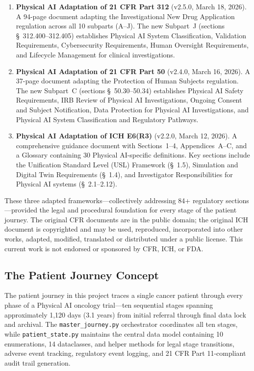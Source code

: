 \documentclass{article}
\begin{document}
\begin{enumerate}[leftmargin=*]
\item \textbf{Physical AI Adaptation of 21 CFR Part 312} (v2.5.0, March 18, 2026). A 94-page document adapting the Investigational New Drug Application regulation across all 10 subparts (A--J). The new Subpart~J (sections \S~312.400--312.405) establishes Physical AI System Classification, Validation Requirements, Cybersecurity Requirements, Human Oversight Requirements, and Lifecycle Management for clinical investigations.

\item \textbf{Physical AI Adaptation of 21 CFR Part 50} (v2.4.0, March 16, 2026). A 37-page document adapting the Protection of Human Subjects regulation. The new Subpart~C (sections \S~50.30--50.34) establishes Physical AI Safety Requirements, IRB Review of Physical AI Investigations, Ongoing Consent and Subject Notification, Data Protection for Physical AI Investigations, and Physical AI System Classification and Regulatory Pathways.

\item \textbf{Physical AI Adaptation of ICH E6(R3)} (v2.2.0, March 12, 2026). A comprehensive guidance document with Sections~1--4, Appendices~A--C, and a Glossary containing 30 Physical AI-specific definitions. Key sections include the Unification Standard Level (USL) Framework (\S~1.5), Simulation and Digital Twin Requirements (\S~1.4), and Investigator Responsibilities for Physical AI systems (\S~2.1--2.12).
\end{enumerate}

These three adapted frameworks---collectively addressing 84+ regulatory sections---provided the legal and procedural foundation for every stage of the patient journey. The original CFR documents are in the public domain; the original ICH document is copyrighted and may be used, reproduced, incorporated into other works, adapted, modified, translated or distributed under a public license. This current work is not endorsed or sponsored by CFR, ICH, or FDA.

\tableofcontents

\vspace{0.05cm}

\subsection{The Patient Journey Concept}

The patient journey in this project traces a single cancer patient through every phase of a Physical AI oncology trial---ten sequential stages spanning approximately 1,120 days (3.1 years) from initial referral through final data lock and archival. The \texttt{master\_journey.py} orchestrator coordinates all ten stages, while \texttt{patient\_state.py} maintains the central data model containing 10 enumerations, 14 dataclasses, and helper methods for legal stage transitions, adverse event tracking, regulatory event logging, and 21 CFR Part 11-compliant audit trail generation.
\end{document}
